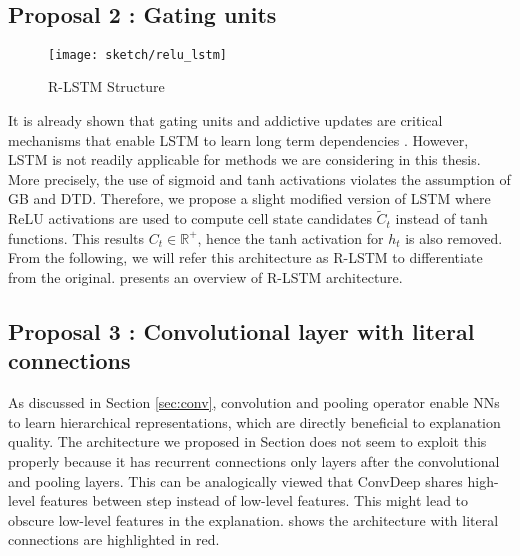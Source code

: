 \begin{figure}
\centering
{} \\

\end{figure}

\subsection{Proposal 2 : Gating units}
\begin{figure}[h]
\centering
\texttt{[image: sketch/relu\_lstm]}
\caption{R-LSTM Structure} 

\label{fig:relu_lstm} 
\end{figure}

It is already shown that gating units and addictive updates are critical mechanisms that enable LSTM to learn long term dependencies \cite{GreffLSTMsearchspace2017, Jozefowiczempiricalexplorationrecurrent2015a}. However, LSTM is not readily applicable for methods we are considering in this thesis. More precisely, the use of sigmoid and tanh activations violates the assumption of GB and DTD. Therefore, we propose a slight modified version of LSTM where ReLU activations are used to compute cell state candidates $\widetilde{C}_t$ instead of tanh functions. This results $C_t \in \mathbb{R}^+$, hence the tanh activation for $h_t$  is also removed.  From the following, we will refer this architecture as R-LSTM to differentiate from the original.  \addfigure{\ref{fig:relu_lstm}} presents an overview of R-LSTM architecture.


\subsection{Proposal 3 : Convolutional layer with literal connections}
As discussed in Section \ref{sec:conv}, convolution and pooling operator enable NNs to learn hierarchical representations, which are directly beneficial to explanation quality. The  architecture we proposed in Section \label{sec:rnn_cell} does not seem to exploit this properly because it has recurrent connections only layers after the convolutional and pooling layers. This can be analogically viewed that ConvDeep shares high-level features between step instead of low-level features. This might lead to obscure low-level features in the explanation. \addfigure{\ref{fig:conv_literalconn}} shows the architecture with literal connections are highlighted in red.



